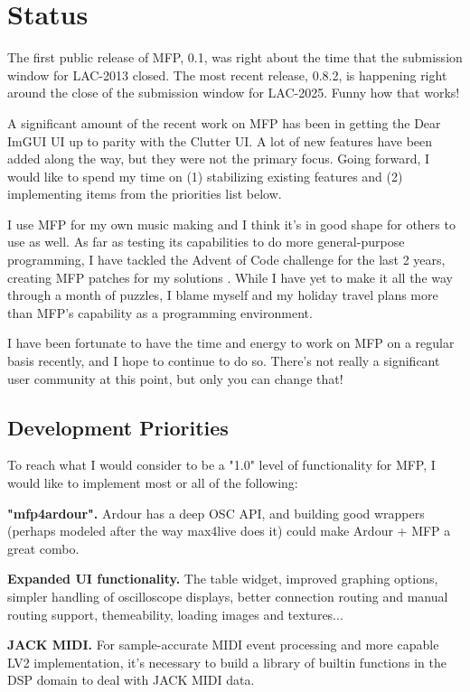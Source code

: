 \documentclass[a4paper]{article}
\def\:{\hskip0pt}
\begin{document}
\section{Status}

The first public release of MFP, 0.1, was right about the time that the
submission window for LAC-2013 closed. The most recent release,
0.8.2, is happening right around the close of the submission window
for LAC-2025. Funny how that works!

A significant amount of the recent work on MFP has been in
getting the Dear ImGUI UI up to parity with the Clutter UI. A lot
of new features have been added along the way, but they were not
the primary focus. Going forward, I would like to spend my time
on (1) stabilizing existing features and (2) implementing items
from the priorities list below.

I use MFP for my own music making and I think it's in good shape
for others to use as well. As far as testing its capabilities to
do more general\:-\:purpose programming, I have tackled the
Advent of Code \cite{AdventOfCode} challenge for the last 2
years, creating MFP patches for my solutions
\cite{Gribble:Advent}. While I have yet to make it all the way
through a month of puzzles, I blame myself and my holiday travel
plans more than MFP's capability as a programming environment.

I have been fortunate to have the time and energy to work on MFP
on a regular basis recently, and I hope to continue to do so.
There's not really a significant user community at this point,
but only you can change that!

\subsection{Development Priorities}

To reach what I would consider to be a "1.0" level of
functionality for MFP, I would like to implement most or all of
the following:

{\bf "mfp4ardour".} Ardour has a deep OSC API, and building good
wrappers (perhaps modeled after the way max4live does it) could
make Ardour + MFP a great combo.

{\bf Expanded UI functionality.} The table widget, improved
graphing options, simpler handling of oscilloscope displays,
better connection routing and manual routing support, themeability,
loading images and textures...

{\bf JACK MIDI.} For sample-accurate MIDI event processing and
more capable LV2 implementation, it's necessary to build a
library of builtin functions in the DSP domain to deal with JACK
MIDI data.
\end{document}
